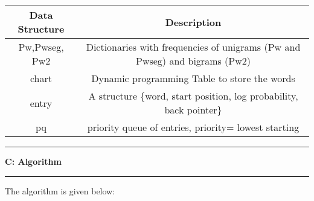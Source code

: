 \documentclass[11pt]{article}
\newcommand\question[2]{\vspace{.25in}\hrule\textbf{#1: #2}\vspace{.5em}\hrule\vspace{.10in}}
\begin{document}
\begin{table}[h]
	\vspace{-4pt}
	\centering
	\renewcommand\arraystretch{1.25}
	\begin{tabular}{|c|c|}
		\hline
		Data Structure   & Description  \\
		\hline
		Pw,Pwseg, Pw2 & Dictionaries with frequencies of unigrams (Pw and Pwseg) and bigrams (Pw2) \\
		\hline
		chart &Dynamic programming Table to store the words\\
		\hline
		entry & A structure \{word, start position, log probability, back pointer\}  \\
		\hline
		pq & priority queue of entries, priority= lowest starting   \\
		\hline
	\end{tabular}
	\vspace{-6pt}
\end{table}

\question{C}{Algorithm} 

The algorithm is given below:		
\end{document}
